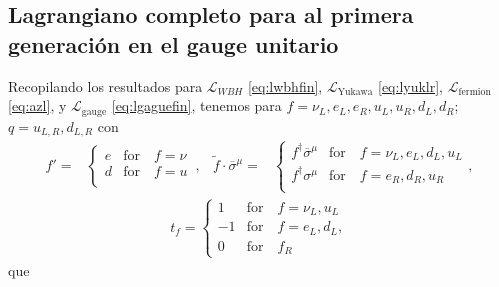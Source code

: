 \subsection{Lagrangiano completo  para al primera generación en el gauge unitario}

Recopilando los resultados para $\mathcal{L}_{WBH}$
\eqref{eq:lwbhfin}, $\mathcal{L}_{\text{Yukawa}}$ \eqref{eq:lyuklr},
$\mathcal{L}_{\text{fermion}}$ \eqref{eq:azl}, y
$\mathcal{L}_{\text{gauge}}$ \eqref{eq:lgaguefin}, tenemos para
$f=\nu_L,e_L,e_R,u_L,u_R,d_L,d_R$; $q=u_{L,R},d_{L,R}$ con
\begin{align}
f'=&
\begin{cases}
  e &\text{for}\quad f=\nu\\
  d &\text{for}\quad f=u\\
\end{cases}\,,&
\widetilde{f}\cdot\overline{\sigma}^{\mu}=&
  \begin{cases}
    f^{\dagger}\overline{\sigma}^{\mu} & \text{for}\quad f=\nu_L,e_L,d_L,u_L\\
    f^{\dagger}{\sigma}^{\mu} & \text{for}\quad f=e_R,d_R,u_R\\
  \end{cases},
\end{align}
\begin{align}
  t_f=
  \begin{cases}
   1 & \text{for}\quad   f=\nu_L,u_L\\
   -1 & \text{for}\quad f=e_L,d_L,\\
   0 & \text{for}\quad f_R
  \end{cases}
\end{align}
que
